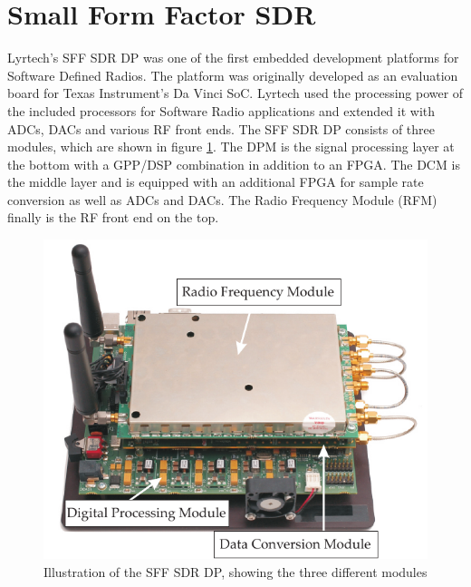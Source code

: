 \section{Small Form Factor SDR}
\label{sec:SFF}
Lyrtech's \ac{SFF SDR DP} \cite{lyrtech_sff_sdr} was one of the first embedded development platforms for Software Defined Radios. The platform was originally developed as an evaluation board for Texas Instrument's Da Vinci \ac{SoC}. Lyrtech used the processing power of the included processors for Software Radio applications and extended it with \acp{ADC}, \acp{DAC} and various RF front ends. The \ac{SFF SDR DP} consists of three modules, which are shown in figure \ref{fig:sff_sdr}. The \ac{DPM} is the signal processing layer at the bottom with a \ac{GPP}/\ac{DSP} combination in addition to an \ac{FPGA}. The \ac{DCM} is the middle layer and is equipped with an additional \ac{FPGA} for sample rate conversion as well as \acp{ADC} and \acp{DAC}. The Radio Frequency Module (RFM) finally is the RF front end on the top. 
\begin{figure}
	\centering
		\includegraphics[]{../kapitel03/figures/sff_sdr.pdf}
	\caption{Illustration of the SFF SDR DP, showing the three different modules}
	\label{fig:sff_sdr}
\end{figure}

